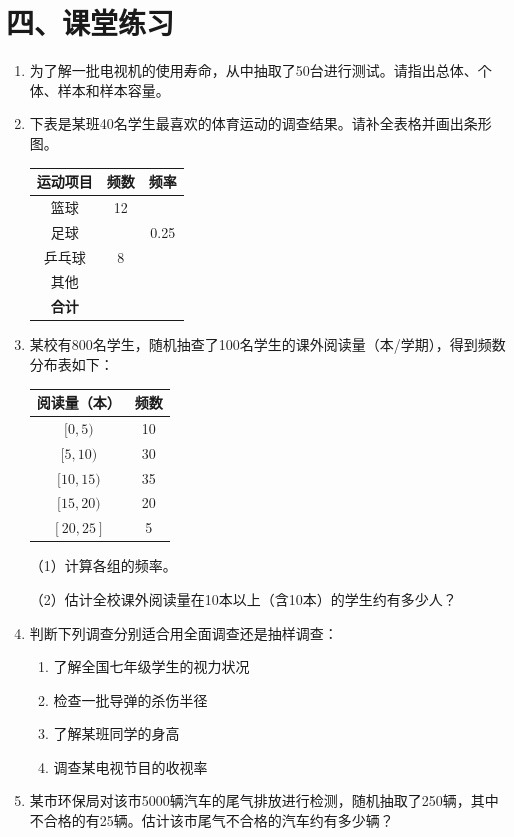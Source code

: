 \documentclass[12pt, a4paper]{ctexart}
\begin{document}
\section*{\textcolor{tipgreen}{四、课堂练习}}

\begin{enumerate}[leftmargin=2em]
  \item 为了解一批电视机的使用寿命，从中抽取了50台进行测试。请指出总体、个体、样本和样本容量。

  \item 下表是某班40名学生最喜欢的体育运动的调查结果。请补全表格并画出条形图。

\begin{center}
\begin{tabular}{|c|c|c|}
\hline
运动项目 & 频数 & 频率 \\
\hline
篮球 & 12 & \\
\hline
足球 & & 0.25 \\
\hline
乒乓球 & 8 & \\
\hline
其他 & & \\
\hline
\textbf{合计} & & \\
\hline
\end{tabular}
\end{center}

  \item 某校有800名学生，随机抽查了100名学生的课外阅读量（本/学期），得到频数分布表如下：

\begin{center}
\begin{tabular}{|c|c|}
\hline
阅读量（本） & 频数 \\
\hline
$[0, 5)$ & 10 \\
\hline
$[5, 10)$ & 30 \\
\hline
$[10, 15)$ & 35 \\
\hline
$[15, 20)$ & 20 \\
\hline
$[20, 25]$ & 5 \\
\hline
\end{tabular}
\end{center}

（1）计算各组的频率。

（2）估计全校课外阅读量在10本以上（含10本）的学生约有多少人？

  \item 判断下列调查分别适合用全面调查还是抽样调查：
\begin{enumerate}[label=(\arabic*)]
  \item 了解全国七年级学生的视力状况
  \item 检查一批导弹的杀伤半径
  \item 了解某班同学的身高
  \item 调查某电视节目的收视率
\end{enumerate}

  \item 某市环保局对该市5000辆汽车的尾气排放进行检测，随机抽取了250辆，其中不合格的有25辆。估计该市尾气不合格的汽车约有多少辆？
\end{enumerate}
\end{document}
